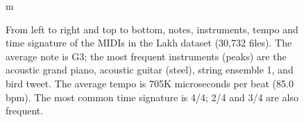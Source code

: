 \documentclass{article}
\begin{document}
\begin{figure}[ht]
    \centering
    \parbox{\linewidth}{
    }
    \parbox{\linewidth}{
    }m
    \caption{From left to right and top to bottom, notes, instruments, tempo and time signature of the MIDIs in the Lakh dataset (30,732 files). The average note is G3; the most frequent instruments (peaks) are the acoustic grand piano, acoustic guitar (steel), string ensemble 1, and bird tweet. The average tempo is 705K microseconds per beat (85.0 bpm). The most common time signature is 4/4; 2/4 and 3/4 are also frequent.}
    \label{fig:stats-lakh}
\end{figure}
\end{document}
